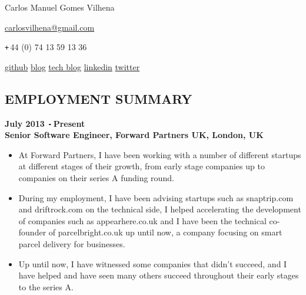 \documentclass{res}
\def\Plus{\texttt{+}\,}
\def\Minus{\texttt{-}\,}
\begin{document}
\thispagestyle{empty}
\centerline{Carlos Manuel Gomes Vilhena}
\vspace{0.1in}
\centerline{\href{mailto:carlosvilhena@gmail.com}{carlosvilhena@gmail.com}}
\centerline{\Plus 44 (0) 74 13 59 13 36}
\centerline{\href{http://github.com/carvil}{github} \hspace{0.5 cm}
\href{http://www.carlosvilhena.com}{blog}  \hspace{0.5 cm}
\href{http://carvil.github.com/}{tech blog}  \hspace{0.5 cm}
\href{http://www.linkedin.com/in/carlosvilhena}{linkedin}  \hspace{0.5 cm}
\href{http://www.twitter.com/carvil_}{twitter}
}


\begin{resume}
\vspace{0.1in}


\section{EMPLOYMENT SUMMARY}
\vspace{0.1in}
  {\bf July 2013 \Minus Present}\\
  {\bf Senior Software Engineer, Forward Partners UK, London, UK}
    \begin{itemize} %
      \item[] At Forward Partners, I have been working with a number of different
        startups at different stages of their growth, from early stage companies
        up to companies on their series A funding round.
      \item[] During my employment, I have been advising startups such as
        snaptrip.com and driftrock.com on the technical side, I helped
        accelerating the development of companies such as appearhere.co.uk
        and I have been the technical co-founder of parcelbright.co.uk up until
        now, a company focusing on smart parcel delivery for businesses.
      \item[] Up until now, I have witnessed some companies that didn't succeed,
        and I have helped and have seen many others succeed throughout their
        early stages to the series A.
    \end{itemize}


\end{resume}
\end{document}
